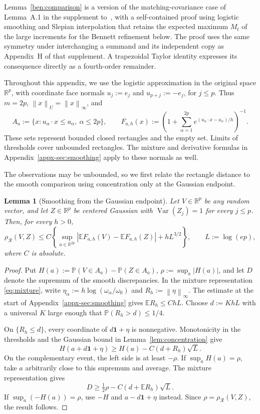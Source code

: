 \documentclass[11pt,letterpaper]{article}
\newenvironment{recovered}{\color{magenta}}{}
\newtheorem{lemma}{Lemma}
\theoremstyle{remark}
\newcommand{\E}{\mathbb E}
\newcommand{\Pp}{\mathbb P}
\newcommand{\R}{\mathbb R}
\newcommand{\Var}{\operatorname{Var}}
\newcommand{\norm}[1]{\left\lVert#1\right\rVert}
\newcommand{\rh}{\rho_{\mathcal R}}
\begin{document}
\begin{recovered}
Lemma~\ref{ben:comparison} is a version of the matching-covariance
case of Lemma~A.1 in the supplement to~\cite{CCKK2022}, with a
self-contained proof using logistic smoothing and Slepian interpolation
that retains the expected maximum \(M_t\) of the large increments
for the Bennett refinement below. The proof uses the same symmetry
under interchanging a summand and its independent copy as Appendix~H
of that supplement. A trapezoidal Taylor identity expresses its
consequence directly as a fourth-order remainder.

Throughout this appendix, we use the logistic approximation in the
original space \(\R^p\), with coordinate face normals
\(u_j:=e_j\) and \(u_{p+j}:=-e_j\), for \(j\le p\).
Thus \(m=2p\), \(\norm x_U=\norm x_\infty\), and
\[
 A_a:=\{x:u_\alpha\cdot x\le a_\alpha,\ \alpha\le2p\},\qquad
 F_{a,h}(x):=\left(1+\sum_{\alpha=1}^{2p}
          e^{(u_\alpha\cdot x-a_\alpha)/h}\right)^{-1}.
\]
These sets represent bounded closed rectangles and the empty set.
Limits of thresholds cover unbounded rectangles. The mixture and
derivative formulas in Appendix~\ref{appx-sec:smoothing} apply to
these normals as well.

The observations may be unbounded, so we first relate the rectangle
distance to the smooth comparison using concentration only at the
Gaussian endpoint.

\begin{lemma}[Smoothing from the Gaussian endpoint]\label{ben:smoothing}
Let \(V\in\R^p\) be any random vector, and let \(Z\in\R^p\)
be centered Gaussian with \(\Var(Z_j)=1\) for every \(j\le p\).
Then, for every \(h>0\),
\begin{equation}\label{ben:gaussian-smoothing}
 \rh(V,Z)\le C\left\{
 \sup_{a\in\R^{2p}}|\E F_{a,h}(V)-\E F_{a,h}(Z)|
       +hL^{3/2}\right\},\qquad L:=\log(ep),
\end{equation}
where \(C\) is absolute.
\end{lemma}
\begin{proof}
Put \(H(a):=\Pp(V\in A_a)-\Pp(Z\in A_a)\),
\(\rho:=\sup_a|H(a)|\), and let \(D\) denote the supremum of
the smooth discrepancies. In the mixture representation
\eqref{eq:mixture}, write
\(\eta_\alpha:=h\log(\omega_\alpha/\omega_0)\) and
\(R_h:=\norm\eta_\infty\). The estimate at the start of
Appendix~\ref{appx-sec:smoothing} gives \(\E R_h\le ChL\).
Choose \(d:=KhL\) with a universal \(K\) large enough that
\(\Pp(R_h>d)\le1/4\).

On \(\{R_h\le d\}\), every coordinate of
\(d\mathbf1+\eta\) is nonnegative. Monotonicity in the thresholds
and the Gaussian bound in Lemma~\ref{lem:concentration} give
\[
 H(a+d\mathbf1+\eta)
 \ge H(a)-C(d+R_h)\sqrt L.
\]
On the complementary event, the left side is at least \(-\rho\).
If \(\sup_aH(a)=\rho\), take \(a\) arbitrarily close to this
supremum and average. The mixture representation gives
\[
 D\ge\tfrac12\rho-C(d+\E R_h)\sqrt L.
\]
If \(\sup_a(-H(a))=\rho\), use \(-H\) and
\(a-d\mathbf1+\eta\) instead. Since \(\rho=\rh(V,Z)\),
the result follows.
\end{proof}


\end{recovered}
\end{document}
